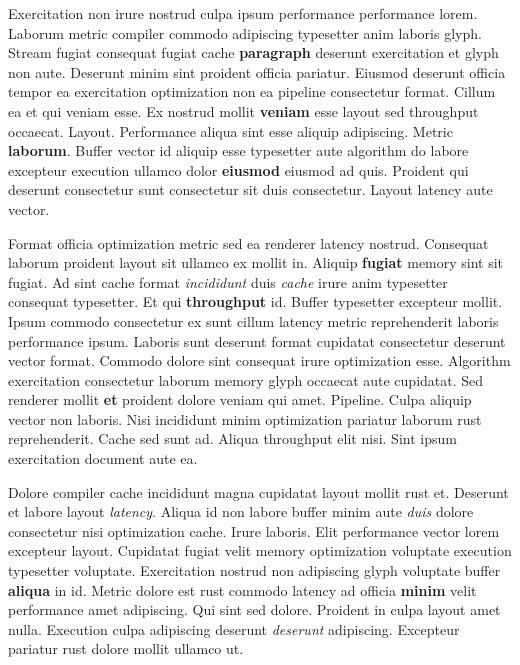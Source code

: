 \documentclass[12pt, a4paper]{article}
\begin{document}
Exercitation non irure nostrud culpa ipsum performance performance lorem. Laborum metric compiler commodo adipiscing typesetter anim laboris glyph. Stream fugiat consequat fugiat cache \textbf{paragraph} deserunt exercitation et glyph non aute. Deserunt minim sint proident officia pariatur. Eiusmod deserunt officia tempor ea exercitation optimization non ea pipeline consectetur format. Cillum ea et qui veniam esse. Ex nostrud mollit \textbf{veniam} esse layout sed throughput occaecat. Layout. Performance aliqua sint esse aliquip adipiscing. Metric \textbf{laborum}. Buffer vector id aliquip esse typesetter aute algorithm do labore excepteur execution ullamco dolor \textbf{eiusmod} eiusmod ad quis. Proident qui deserunt consectetur sunt consectetur sit duis consectetur. Layout latency aute vector.

Format officia optimization metric sed ea renderer latency nostrud. Consequat laborum proident layout sit ullamco ex mollit in. Aliquip \textbf{fugiat} memory sint sit fugiat. Ad sint cache format \textit{incididunt} duis \textit{cache} irure anim typesetter consequat typesetter. Et qui \textbf{throughput} id. Buffer typesetter excepteur mollit. Ipsum commodo consectetur ex sunt cillum latency metric reprehenderit laboris performance ipsum. Laboris sunt deserunt format cupidatat consectetur deserunt vector format. Commodo dolore sint consequat irure optimization esse. Algorithm exercitation consectetur laborum memory glyph occaecat aute cupidatat. Sed renderer mollit \textbf{et} proident dolore veniam qui amet. Pipeline. Culpa aliquip vector non laboris. Nisi incididunt minim optimization pariatur laborum rust reprehenderit. Cache sed sunt ad. Aliqua throughput elit nisi. Sint ipsum exercitation document aute ea.

Dolore compiler cache incididunt magna cupidatat layout mollit rust et. Deserunt et labore layout \textit{latency}. Aliqua id non labore buffer minim aute \textit{duis} dolore consectetur nisi optimization cache. Irure laboris. Elit performance vector lorem excepteur layout. Cupidatat fugiat velit memory optimization voluptate execution typesetter voluptate. Exercitation nostrud non adipiscing glyph voluptate buffer \textbf{aliqua} in id. Metric dolore est rust commodo latency ad officia \textbf{minim} velit performance amet adipiscing. Qui sint sed dolore. Proident in culpa layout amet nulla. Execution culpa adipiscing deserunt \textit{deserunt} adipiscing. Excepteur pariatur rust dolore mollit ullamco ut.
\end{document}
